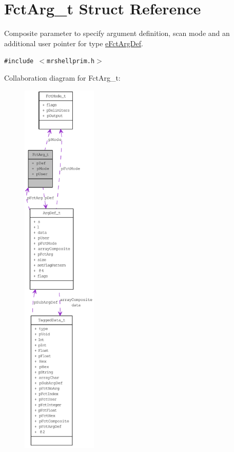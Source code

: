 \hypertarget{structFctArg__t}{
\section{Fct\-Arg\_\-t Struct Reference}
\label{structFctArg__t}
}
Composite parameter to specify argument definition, scan mode and an additional user pointer for type \hyperlink{mrshellprim_8h_76a810650461f2062938ee9b82666b3607fd24779fbb8e0bc12b8241e0e436cc}{e\-Fct\-Arg\-Def}.  


{\tt \#include $<$mrshellprim.h$>$}

Collaboration diagram for Fct\-Arg\_\-t:\begin{figure}[H]
\begin{center}
\leavevmode
\includegraphics[width=101pt]{structFctArg__t__coll__graph}
\end{center}
\end{figure}
